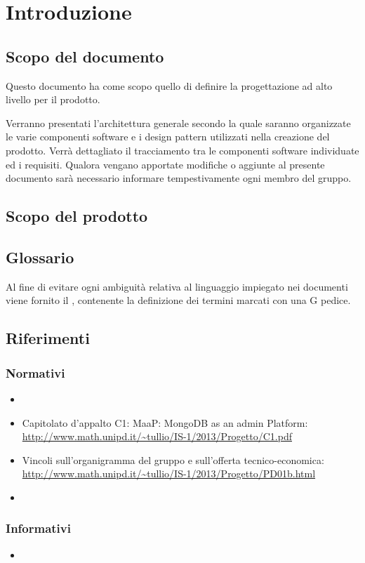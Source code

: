 \section{Introduzione}

\subsection{Scopo del documento}

Questo documento ha come scopo quello di definire la progettazione ad alto livello per il prodotto.

Verranno presentati l'architettura generale secondo la quale saranno organizzate le varie componenti software e i design pattern utilizzati nella creazione del prodotto.
Verrà dettagliato il tracciamento tra le componenti software individuate ed i requisiti.
Qualora vengano apportate modifiche o aggiunte al presente documento sarà necessario informare tempestivamente ogni membro del gruppo.

\subsection{Scopo del prodotto}

\ScopoDelProdotto

\subsection{Glossario}

Al fine di evitare ogni ambiguità relativa al linguaggio impiegato nei documenti viene fornito il \Glossario{}, contenente la definizione dei termini marcati con una G pedice.

\subsection{Riferimenti}
	\label{Riferimenti}
	
		\subsubsection{Normativi}
		
		\begin{itemize}
		\item \NormeDiProgetto{}
		\item Capitolato d'appalto C1: MaaP: MongoDB as an admin Platform:\\
			\url{http://www.math.unipd.it/~tullio/IS-1/2013/Progetto/C1.pdf}
		\item Vincoli sull'organigramma del gruppo e sull'offerta tecnico-economica:\\
			\url{http://www.math.unipd.it/~tullio/IS-1/2013/Progetto/PD01b.html}
		\item \AnalisiDeiRequisiti  \\	
        \end{itemize}
        
		\subsubsection{Informativi}
		\begin{itemize}
			\item \AnalisiDeiRequisiti{}
		\end{itemize}
		
	\pagebreak